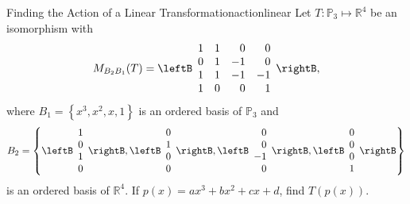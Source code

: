 \begin{example}{Finding the Action of a Linear Transformation}{actionlinear}
Let $T: \mathbb{P}_3 \mapsto \mathbb{R}^4$ be an isomorphism with
\[
M_{B_2B_1}(T) = \leftB \begin{array}{rrrr}
1 & 1 & 0 & 0 \\
0 & 1 & -1 & 0 \\
1 & 1 & -1 & -1 \\
1 & 0 & 0 & 1 
\end{array} \rightB,
\]
where $B_1 = \left\{ x^3, x^2, x, 1 \right\}$ is an ordered basis of $\mathbb{P}_3$ and 
\[
B_2 = \left\{ \leftB \begin{array}{r}
1 \\
0 \\
1 \\
0
\end{array} \rightB, \leftB \begin{array}{r}
0 \\
1 \\
0 \\
0
\end{array} \rightB, 
\leftB \begin{array}{r}
0 \\
0 \\
-1 \\
0
\end{array} \rightB, 
\leftB \begin{array}{r}
0 \\
0 \\
0 \\
1
\end{array} \rightB \right\} 
\]
is an ordered basis of $\mathbb{R}^4$. If $p(x) = ax^3 + bx^2 + cx + d$, find $T(p(x))$. 
\end{example}

